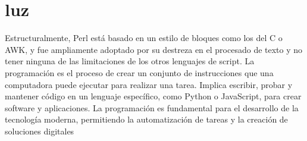 \section{luz }  
Estructuralmente, Perl está basado en un estilo de bloques como los del C o AWK, y fue ampliamente adoptado por su destreza en el procesado de texto y no tener ninguna de las limitaciones de los otros lenguajes de script. La programación es el proceso de crear un conjunto de instrucciones que una computadora puede ejecutar para realizar una tarea. Implica escribir, probar y mantener código en un lenguaje específico, como Python o JavaScript, para crear software y aplicaciones. La programación es fundamental para el desarrollo de la tecnología moderna, permitiendo la automatización de tareas y la creación de soluciones digitales